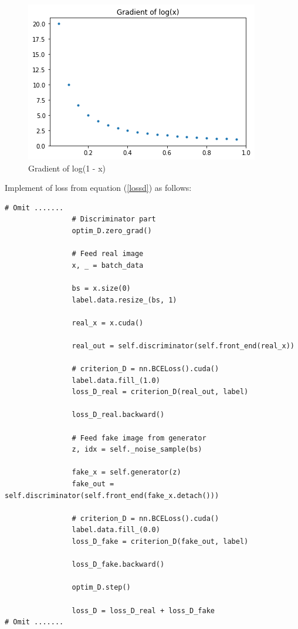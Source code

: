 \documentclass[12pt]{article}
\begin{document}
\begin{figure}[H]
\centering
\includegraphics[width=\linewidth]{Images/gradientlog2.png}
\caption{Gradient of log(1 - x)}
\end{figure}

Implement of loss from equation (\ref{lossd}) as follows:

\begin{verbatim}
# Omit .......
                # Discriminator part
                optim_D.zero_grad()
                
                # Feed real image
                x, _ = batch_data
                
                bs = x.size(0)
                label.data.resize_(bs, 1)
                
                real_x = x.cuda()
                
                real_out = self.discriminator(self.front_end(real_x))
                
                # criterion_D = nn.BCELoss().cuda()
                label.data.fill_(1.0)
                loss_D_real = criterion_D(real_out, label)
                
                loss_D_real.backward()
                
                # Feed fake image from generator
                z, idx = self._noise_sample(bs)
                
                fake_x = self.generator(z)
                fake_out = self.discriminator(self.front_end(fake_x.detach()))
                
                # criterion_D = nn.BCELoss().cuda()
                label.data.fill_(0.0)
                loss_D_fake = criterion_D(fake_out, label)
                
                loss_D_fake.backward()
                
                optim_D.step()
                
                loss_D = loss_D_real + loss_D_fake
# Omit .......
\end{verbatim}
\end{document}
